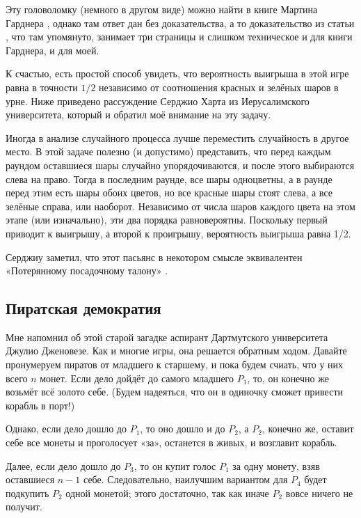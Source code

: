 Эту головоломку (немного в другом виде) можно найти в книге Мартина Гарднера \cite[2.16]{gardner2005}, однако там ответ дан без доказательства, а то доказательство из статьи \cite{oakley-perry}, что там упомянуто, занимает три страницы и слишком техническое и для книги Гарднера, и для моей.

К счастью, есть простой способ увидеть, что вероятность выигрыша в этой игре равна в точности $1/2$ независимо от соотношения красных и зелёных шаров в урне.
Ниже приведено рассуждение Серджио Харта из Иерусалимского университета, который и обратил моё внимание на эту задачу.

Иногда в анализе случайного процесса лучше переместить случайность в другое место.
В этой задаче полезно (и допустимо) представить, что перед каждым раундом оставшиеся шары случайно упорядочиваются, и после этого выбираются слева на право.
Тогда в последним раунде, все шары одноцветны, а в раунде перед этим есть шары обоих цветов, но все красные шары стоят слева, а все зелёные справа, или наоборот.
Независимо от числа шаров каждого цвета на этом этапе (или изначально), эти два порядка равновероятны.
Поскольку первый приводит к выигрышу, а второй к проигрышу, вероятность выигрыша равна 1/2.

Серджиу заметил, что этот пасьянс в некотором смысле эквивалентен «Потерянному посадочному талону» \cite[p. 35]{winkler}.

\subsection*{Пиратская демократия}

Мне напомнил об этой старой загадке аспирант Дартмутского университета Джулио Дженовезе.
Как и многие игры, она решается обратным ходом.
Давайте пронумеруем пиратов от младшего к старшему, и пока будем счиать, что у них всего $n$ монет.
Если дело дойдёт до самого младшего $P_1$, то, он конечно же возьмёт всё золото себе.
(Будем надеяться, что он в одиночку сможет привести корабль в порт!)

Однако, если дело дошло до $P_1$, то оно дошло и до $P_2$, а
$P_2$, конечно же, оставит себе все монеты и проголосует «за», останется в живых, и возглавит корабль.

Далее, если дело дошло до $P_3$, то он купит голос $P_1$ за одну монету, взяв оставшиеся $n - 1$ себе.
Следовательно, наилучшим вариантом для $P_4$ будет подкупить $P_2$ одной монетой;
этого достаточно, так как иначе $P_2$ вовсе ничего не получит.


